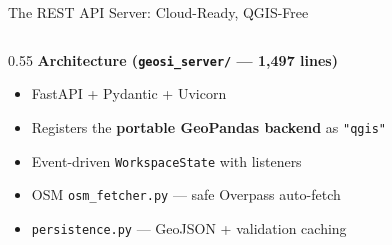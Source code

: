 \documentclass[aspectratio=169,11pt]{beamer}
\newcommand{\kw}[1]{{\color{geositeal}\bfseries #1}}
\begin{document}
\begin{frame}{The REST API Server: Cloud-Ready, QGIS-Free}
  \small
  \begin{columns}[T,onlytextwidth]
    \begin{column}{0.55\textwidth}
      \textbf{Architecture (\texttt{geosi\_server/} --- 1{,}497 lines)}
      \begin{itemize}
        \item FastAPI + Pydantic + Uvicorn
        \item Registers the \kw{portable GeoPandas backend} as \texttt{"qgis"}
        \item Event-driven \texttt{WorkspaceState} with listeners
        \item OSM \texttt{osm\_fetcher.py} --- safe Overpass auto-fetch
        \item \texttt{persistence.py} --- GeoJSON + validation caching
      \end{itemize}


\end{column}
\end{columns}
\end{frame}
\end{document}
